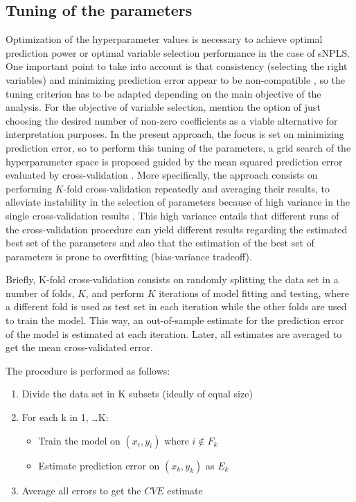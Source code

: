 \subsection{Tuning of the parameters}
Optimization of the hyperparameter values is necessary to achieve optimal prediction power or optimal variable selection performance in the case of sNPLS. One important point to take into account is that consistency (selecting the right variables) and minimizing prediction error appear to be non-compatible \parencite{yang2005can}, so the tuning criterion has to be adapted depending on the main objective of the analysis. For the objective of variable selection, \textcite{zou2005regularization} mention the option of just choosing the desired number of non-zero coefficients as a viable alternative for interpretation purposes. In the present approach, the focus is set on minimizing prediction error, so to perform this tuning of the parameters, a grid search of the hyperparameter space \parencite{lameski2015svm} is proposed guided by the mean squared prediction error evaluated by cross-validation \parencite{duarte2017empirical}. More specifically, the approach consists on performing $K$-fold cross-validation repeatedly and averaging their results, to alleviate instability in the selection of parameters because of high variance in the single cross-validation results \parencite{krstajic2014cross}. This high variance entails that different runs of the cross-validation procedure can yield different results regarding the estimated best set of the parameters and also that the estimation of the best set of parameters is prone to overfitting (bias-variance tradeoff).

Briefly, K-fold cross-validation consists on randomly splitting the data set in a number of folds, $K$, and perform $K$ iterations of model fitting and testing, where a different fold is used as test set in each iteration while the other folds are used to train the model. This way, an out-of-sample estimate for the prediction error of the model is estimated at each iteration. Later, all estimates are averaged to get the mean cross-validated error. 

The procedure is performed as follows:
\vspace{20pt}
\begin{enumerate}
    \item Divide the data set in K subsets (ideally of equal size)
    \item For each k in 1, \dots K:
    \begin{itemize}
        \item Train the model on $(x_i, y_i)$ where $i \notin F_k$
        \item Estimate prediction error on $(x_k, y_k)$ as $E_k$
    \end{itemize}
    \item Average all errors to get the $CVE$ estimate
\end{enumerate}

